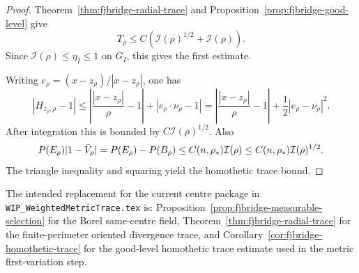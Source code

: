 \begin{proof}
Theorem~\ref{thm:fjbridge-radial-trace} and
Proposition~\ref{prop:fjbridge-good-level} give
\[
   T_\rho\le
   C\left(\mathcal I(\rho)^{1/2}+\mathcal I(\rho)\right).
\]
Since \(\mathcal I(\rho)\le\eta_I\le1\) on \(G_I\), this gives the
first estimate.

Writing \(e_\rho=(x-z_\rho)/|x-z_\rho|\), one has
\[
   |H_{z_\rho,\rho}-1|
   \le
   \left|\frac{|x-z_\rho|}{\rho}-1\right|
   +|e_\rho\cdot\nu_\rho-1|
   =
   \left|\frac{|x-z_\rho|}{\rho}-1\right|
   +\frac12|e_\rho-\nu_\rho|^2.
\]
After integration this is bounded by \(C\mathcal I(\rho)^{1/2}\).  Also
\[
   P(E_\rho)|1-\bar V_\rho|
   =P(E_\rho)-P(B_\rho)
   \le C(n,\rho_*)\mathcal I(\rho)
   \le C(n,\rho_*)\mathcal I(\rho)^{1/2}.
\]
The triangle inequality and squaring yield the homothetic trace bound.
\end{proof}

\begin{remark}
\label{rem:fjbridge-import-point}
The intended replacement for the current centre package in
\texttt{WIP\_WeightedMetricTrace.tex} is:
Proposition~\ref{prop:fjbridge-measurable-selection} for the Borel
same-centre field, Theorem~\ref{thm:fjbridge-radial-trace} for the
finite-perimeter oriented divergence trace, and
Corollary~\ref{cor:fjbridge-homothetic-trace} for the good-level
homothetic trace estimate used in the metric first-variation step.
\end{remark}

